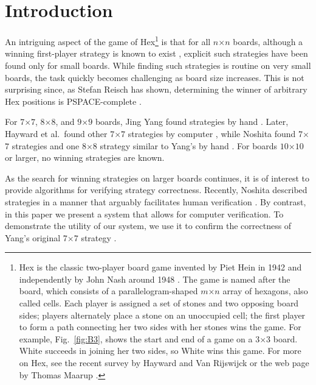 \documentclass{llncs}
\newcommand{\board}[2]{\mbox{$#1$$\times$$#2$}}
\begin{document}
\section{Introduction}
An intriguing aspect of the game of Hex\footnote{
  Hex is the classic two-player board game invented by Piet Hein in
  1942 and independently by John Nash around 1948 
  \cite{Nash52,Gardner57,Gardner59,Maarup05,Maarup05w,Nasar98}.
  The game is named after the board,
  which consists of a parallelogram-shaped $m$$\times$$n$ array of
  hexagons, also called cells. 
  Each player is assigned a set of
  stones and two opposing board sides;
  players alternately place a stone on an unoccupied cell; 
  the first player to form a path connecting her two sides
  with her stones wins the game.
  For example,  Fig.~\ref{fig:B3},
  shows the start and end of a game on a \board{3}{3} board.
  White succeeds in joining her two sides, so White wins this game.
  For more on Hex, see the recent survey by 
  Hayward and Van Rijswijck \cite{HaywardvanR05}
  or the web page by Thomas Maarup \cite{Maarup05w}.}
is that for all \board{n}{n} boards,
although a winning first-player strategy is known to exist
\cite{Nash52,Gardner57,Gardner59},
explicit such strategies have been found only for small boards.
While finding such strategies is routine on very small boards,
the task quickly becomes challenging as board size increases.
This is not surprising since, as Stefan Reisch has shown, 
determining the winner of arbitrary Hex positions is PSPACE-complete
\cite{Reisch81}.

For \board{7}{7}, \board{8}{8}, and \board{9}{9} boards,
Jing Yang found strategies by hand \cite{Yang01,Yang02a,Yang02b,Yang03}.
Later, Hayward et al.~found other \board{7}{7} strategies by computer 
\cite{HaywardEtAl03,HaywardEtAl05},
while Noshita found \board{7}{7} strategies
and one \board{8}{8} strategy similar to Yang's by hand \cite{Noshita05}.
For boards \board{10}{10} or larger, no winning strategies are known.

As the search for winning strategies on larger boards continues,
it is of interest to provide algorithms 
for verifying strategy correctness.
Recently, Noshita described strategies in a manner 
that arguably facilitates human verification \cite{Noshita05}.
By contrast, in this paper we present 
a system that allows for computer verification.
To demonstrate the utility of our system, we use it to
confirm the correctness of Yang's original \board{7}{7} strategy \cite{Yang01}.
\end{document}
